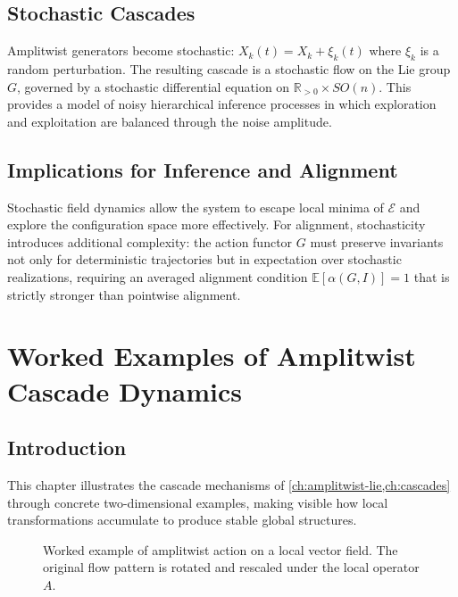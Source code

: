 \documentclass[12pt,a4paper,oneside]{book}
\numberwithin{equation}{chapter}
\theoremstyle{plain}
\theoremstyle{definition}
\theoremstyle{remark}
\begin{document}
\section{Stochastic Cascades}

Amplitwist generators become stochastic: $X_k(t) = X_k +
\xi_k(t)$ where $\xi_k$ is a random perturbation. The resulting
cascade is a stochastic flow on the Lie group $G$, governed by a
stochastic differential equation on $\mathbb{R}_{>0} \times SO(n)$.
This provides a model of noisy hierarchical inference processes in
which exploration and exploitation are balanced through the noise
amplitude.

\section{Implications for Inference and Alignment}

Stochastic field dynamics allow the system to escape local minima of
$\mathcal{E}$ and explore the configuration space more effectively.
For alignment, stochasticity introduces additional complexity: the
action functor $G$ must preserve invariants not only for
deterministic trajectories but in expectation over stochastic
realizations, requiring an averaged alignment condition
$\mathbb{E}[\alpha(G,I)] = 1$ that is strictly stronger than
pointwise alignment.


\chapter[Worked Examples of Cascade Dynamics]{Worked Examples of Amplitwist Cascade Dynamics}
\label{ch:examples}

\section{Introduction}

This chapter illustrates the cascade mechanisms of
\cref{ch:amplitwist-lie,ch:cascades} through concrete
two-dimensional examples, making visible how local transformations
accumulate to produce stable global structures.

\begin{figure}[htbp]
\centering
{}
\caption{Worked example of amplitwist action on a local vector field.
The original flow pattern is rotated and rescaled under the local
operator $A$.}
\label{fig:worked-flow-example}
\end{figure}
\end{document}

